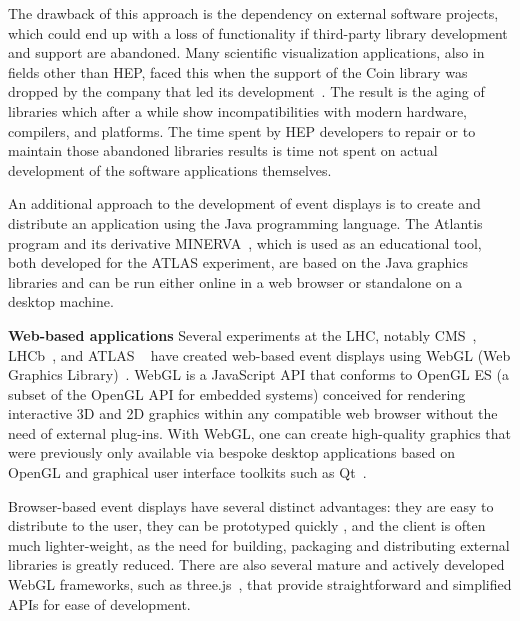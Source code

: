 \documentclass[12pt,a4paper]{article}
\begin{document}
The drawback of this approach is the dependency on external software projects, which could end up with a loss of functionality if
third-party library development and support are abandoned. Many scientific visualization applications, also in fields other than
HEP, faced this when the support of the Coin library was dropped by the company that led its development~\cite{CoinEndOfLifeLetter}.
The result is the aging of libraries which after a while show incompatibilities with modern hardware, compilers, and platforms. The time
spent by HEP developers to repair or to maintain those abandoned libraries results is time not spent on actual development
of the software applications themselves.

An additional approach to the development of event displays is to create and distribute an application using the Java programming language. The Atlantis~\cite{ATLASAtlantis}
program and its derivative MINERVA~\cite{ATLASMinerva}, which is used as an educational tool, both developed for the ATLAS experiment, are based on the Java graphics libraries and can be run either online in a web browser or standalone on a desktop machine.


{\bf Web-based applications} Several experiments at the LHC, notably CMS~\cite{CMSISpyWebGL}, LHCb~\cite{LHCbOnline2014}, and ATLAS
~\cite{ATLASTada2016, ATLASTracer2015} have created web-based event displays using WebGL (Web Graphics Library)~\cite{WebGL2011}.
WebGL is a JavaScript API that conforms to OpenGL ES (a subset of the OpenGL API for embedded systems) conceived for
rendering interactive 3D and 2D graphics within any compatible web browser without the need of external plug-ins. With WebGL,
one can create high-quality graphics that were previously only available via bespoke desktop applications based on OpenGL and
graphical user interface toolkits such as Qt~\cite{QtFramework}.

Browser-based event displays have several distinct advantages: they are easy to distribute to the user, they can be prototyped quickly
, and the client is often much lighter-weight, as the need for building, packaging and distributing external libraries is greatly reduced.
There are also several mature and actively developed WebGL frameworks, such as three.js~\cite{ThreeJS}, that provide straightforward
and simplified APIs for ease of development.


\end{document}
